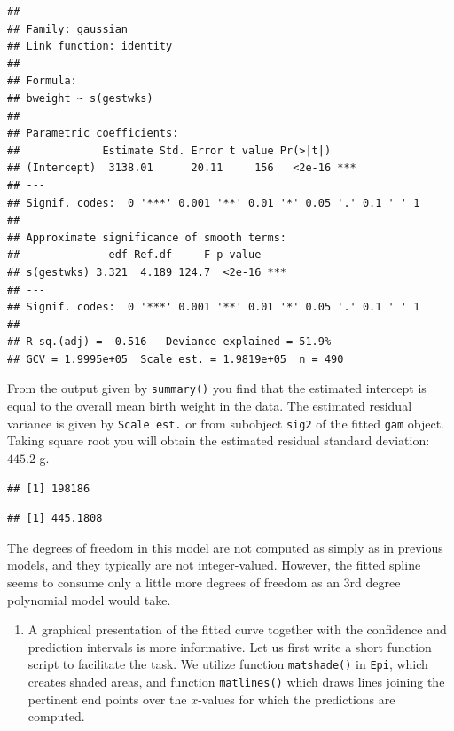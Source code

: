 \documentclass[
]{book}
\newenvironment{Shaded}{\begin{snugshade}}{\end{snugshade}}
\newcommand{\FunctionTok}[1]{\textcolor[rgb]{0.13,0.29,0.53}{\textbf{#1}}}
\newcommand{\NormalTok}[1]{#1}
\newcommand{\SpecialCharTok}[1]{\textcolor[rgb]{0.81,0.36,0.00}{\textbf{#1}}}
\providecommand{\tightlist}{%
  \setlength{\itemsep}{0pt}\setlength{\parskip}{0pt}}
\begin{document}
\begin{verbatim}
## 
## Family: gaussian 
## Link function: identity 
## 
## Formula:
## bweight ~ s(gestwks)
## 
## Parametric coefficients:
##             Estimate Std. Error t value Pr(>|t|)    
## (Intercept)  3138.01      20.11     156   <2e-16 ***
## ---
## Signif. codes:  0 '***' 0.001 '**' 0.01 '*' 0.05 '.' 0.1 ' ' 1
## 
## Approximate significance of smooth terms:
##              edf Ref.df     F p-value    
## s(gestwks) 3.321  4.189 124.7  <2e-16 ***
## ---
## Signif. codes:  0 '***' 0.001 '**' 0.01 '*' 0.05 '.' 0.1 ' ' 1
## 
## R-sq.(adj) =  0.516   Deviance explained = 51.9%
## GCV = 1.9995e+05  Scale est. = 1.9819e+05  n = 490
\end{verbatim}

From the output given by \texttt{summary()} you find that the
estimated intercept is equal to the overall mean birth
weight in the data. The estimated residual variance is given by
\texttt{Scale\ est.} or from subobject \texttt{sig2} of the fitted
\texttt{gam} object. Taking square root you will obtain the estimated
residual standard deviation: \(445.2\) g.

\begin{Shaded}
\end{Shaded}

\begin{verbatim}
## [1] 198186
\end{verbatim}

\begin{Shaded}
\end{Shaded}

\begin{verbatim}
## [1] 445.1808
\end{verbatim}

The degrees of freedom in this model are not computed as simply as in previous
models, and they typically are not integer-valued. However,
the fitted spline seems to consume only a little more degrees of freedom
as an 3rd degree polynomial model would take.

\begin{enumerate}
\def\labelenumi{\arabic{enumi}.}
\setcounter{enumi}{1}
\tightlist
\item
  A graphical presentation of the fitted curve together with the
  confidence and prediction intervals is more informative.
  Let us first write a
  short function script to facilitate the task. We utilize function \texttt{matshade()} in \texttt{Epi}, which creates shaded areas, and function \texttt{matlines()} which draws
  lines joining the pertinent end points over the \(x\)-values for which the
  predictions are computed.
\end{enumerate}
\end{document}
